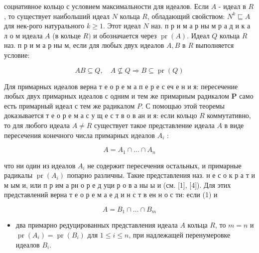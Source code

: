 \documentclass[10pt]{article}
\begin{document}
социативное кольцо с условием максимальности для идеалов. Если $A$ - идеал в $R$, то существует наибольший идеал $N$ кольца $R$, обладающий свойством: $N^{k} \sqsubseteq A$ для нек-рого натурального $k \geqslant 1$. Этот идеал $N$ наз. п р и м а р ны м р а д и к а л о м идеала $A$ (в кольце $R)$ и обозначается через $\operatorname{pr}(A)$. Идеал $Q$ кольца $R$ наз. п р и м а р ны м, если для любых двух идеалов $A, B$ в $R$ выполняется условие:



\[

A B \subseteq Q, \quad A \nsubseteq Q \Rightarrow B \subseteq \operatorname{pr}(Q)

\]



Для примарных идеалов верна т е о р е м а п е р е с еч е н и я: пересечение любых двух примарных идеалов с одним и тем же примарным радикалом $\boldsymbol{P}$ само есть примарный идеал с тем же радикалом $P$. С помощью этой теоремы доказывается т е о р е м а с у щ е с т в о в ан и я: если кольцо $R$ коммутативно, то для любого идеала $A \neq R$ существует такое представление идеала $A$ в виде пересечения конечного числа примарных идеалов $A_{i}$ :



\[

A=A_{1} \cap \ldots \cap A_{n}

\]



что ни один из идеалов $A_{i}$ не содержит пересечения остальных, и примарные радикалы $\operatorname{pr}\left(A_{i}\right)$ попарно различны. Такие представления наз. н е с о к р а т и м ым и, или п р им а рн о р е д уци р о в а ны ы и (см. [1], [4]). Для этих представлений верна т е о р е м а е д и н с т в ен н о с ти: если (1) и



\[

A=B_{1} \cap \ldots \cap B_{m}

\]



\begin{itemize}

  \item два примарно редуцированных представления идеала $A$ кольца $R$, то $m=n$ и $\operatorname{pr}\left(A_{i}\right)=\operatorname{pr}\left(B_{i}\right)$ для $1 \leqslant i \leqslant n$, при надлежащей перенумеровке идеалов $B_{i}$.

\end{itemize}
\end{document}
